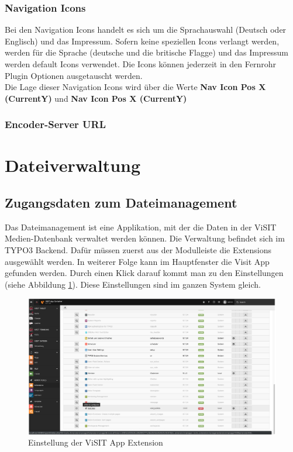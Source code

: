 \subsubsection{Navigation Icons}

Bei den Navigation Icons handelt es sich um die Sprachauswahl (Deutsch oder Englisch) und das Impressum. Sofern keine speziellen Icons verlangt werden, werden für die Sprache (deutsche und die britische Flagge) und das Impressum werden default Icons verwendet. Die Icons können jederzeit in den Fernrohr Plugin Optionen ausgetauscht werden.\\

Die Lage dieser Navigation Icons wird über die Werte \textbf{Nav Icon Pos X (CurrentY)} und \textbf{Nav Icon Pos X (CurrentY)}

\subsubsection{Encoder-Server URL}



\cleardoublepage

\section{Dateiverwaltung}

\subsection{Zugangsdaten zum Dateimanagement}

Das Dateimanagement ist eine Applikation, mit der die Daten in der ViSIT Medien-Datenbank verwaltet werden können. Die Verwaltung befindet sich im TYPO3 Backend. Dafür müssen zuerst aus der Modulleiste die Extensions ausgewählt werden. In weiterer Folge kann im Hauptfenster die Visit App gefunden werden. Durch einen Klick darauf kommt man zu den Einstellungen (siehe Abbildung \ref{img:einstellung_extension}). Diese Einstellungen sind im ganzen System gleich.

\begin{figure}[ht!]
\centering
\includegraphics[width=12cm]{Figures/paula/dateiverwaltung/einstellung_extension.png}
\caption{Einstellung der ViSIT App Extension}
\label{img:einstellung_extension}
\end{figure}

